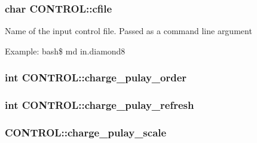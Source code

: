 \hypertarget{struct_c_o_n_t_r_o_l_a043a69ab74c88566115800df9cffc2f1}{
\subsubsection[{cfile}]{\setlength{\rightskip}{0pt plus 5cm}char C\-O\-N\-T\-R\-O\-L\-::cfile}}\label{struct_c_o_n_t_r_o_l_a043a69ab74c88566115800df9cffc2f1}
Name of the input control file. Passed as a command line argument

Example\-: bash\$ md in.\-diamond8 \hypertarget{struct_c_o_n_t_r_o_l_a938e4b96d4c591f6a93faca8786a7400}{
\subsubsection[{charge\-\_\-pulay\-\_\-order}]{\setlength{\rightskip}{0pt plus 5cm}int C\-O\-N\-T\-R\-O\-L\-::charge\-\_\-pulay\-\_\-order}}\label{struct_c_o_n_t_r_o_l_a938e4b96d4c591f6a93faca8786a7400}
\hypertarget{struct_c_o_n_t_r_o_l_aacf810c92564dc26939525d0468f4d97}{
\subsubsection[{charge\-\_\-pulay\-\_\-refresh}]{\setlength{\rightskip}{0pt plus 5cm}int C\-O\-N\-T\-R\-O\-L\-::charge\-\_\-pulay\-\_\-refresh}}\label{struct_c_o_n_t_r_o_l_aacf810c92564dc26939525d0468f4d97}
\hypertarget{struct_c_o_n_t_r_o_l_a999bf04e317db074f1ca526ef057504f}{
\subsubsection[{charge\-\_\-pulay\-\_\-scale}]{ C\-O\-N\-T\-R\-O\-L\-::charge\-\_\-pulay\-\_\-scale}}\label{struct_c_o_n_t_r_o_l_a999bf04e317db074f1ca526ef057504f}
